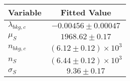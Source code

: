 \begin{tabular}[t]{lc}
\hline
Variable &Fitted Value\\
\hline\hline
$\lambda_{bkg,c}$&$-0.00456\pm0.00047$\\
\hline
$\mu_{S}$&$1968.62\pm0.17$\\
\hline
$n_{bkg,c}$&$(6.12\pm0.12)\times 10^3$\\
\hline
$n_{S}$&$(6.44\pm0.12)\times 10^3$\\
\hline
$\sigma_{S}$&$9.36\pm0.17$\\
\hline
\end{tabular}
